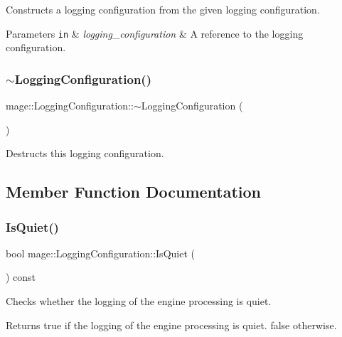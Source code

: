 Constructs a logging configuration from the given logging configuration.


\begin{DoxyParams}[1]{Parameters}
\mbox{\tt in}  & {\em logging\+\_\+configuration} & A reference to the logging configuration. \\
\hline
\end{DoxyParams}
\hypertarget{structmage_1_1_logging_configuration_ad00ecf9ceadffac0c35d102f50fbd8c7}{}\label{structmage_1_1_logging_configuration_ad00ecf9ceadffac0c35d102f50fbd8c7} 
\subsubsection{\texorpdfstring{$\sim$\+Logging\+Configuration()}{~LoggingConfiguration()}}
{\footnotesize\ttfamily mage\+::\+Logging\+Configuration\+::$\sim$\+Logging\+Configuration (\begin{DoxyParamCaption}{ }\end{DoxyParamCaption})}

Destructs this logging configuration. 

\subsection{Member Function Documentation}
\hypertarget{structmage_1_1_logging_configuration_ac081313b7a9440bcd73b6a9b69ff3452}{}\label{structmage_1_1_logging_configuration_ac081313b7a9440bcd73b6a9b69ff3452} 
\subsubsection{\texorpdfstring{Is\+Quiet()}{IsQuiet()}}
{\footnotesize\ttfamily bool mage\+::\+Logging\+Configuration\+::\+Is\+Quiet (\begin{DoxyParamCaption}{ }\end{DoxyParamCaption}) const}

Checks whether the logging of the engine processing is quiet.

\begin{DoxyReturn}{Returns}
{\ttfamily true} if the logging of the engine processing is quiet. {\ttfamily false} otherwise. 
\end{DoxyReturn}
\hypertarget{structmage_1_1_logging_configuration_a13d91de33f888eee31f4d4e6b1237675}{}\label{structmage_1_1_logging_configuration_a13d91de33f888eee31f4d4e6b1237675} 
